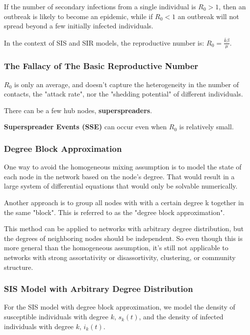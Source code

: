 \documentclass[11pt]{scrartcl} %
\begin{document}
If the number of secondary infections from a single individual is $R_0>1$, then an outbreak is likely to become an epidemic, while if $R_0<1$ an outbreak will not spread beyond a few initially infected individuals.

In the context of SIS and SIR models, the reproductive number is: $R_0 = \frac{\bar{k}\beta}{\mu}$.


\subsubsection{The Fallacy of The Basic Reproductive Number}
$R_0$ is only an average, and doesn't capture the heterogeneity in the number of contacts, the "attack rate", nor the "shedding potential" of different individuals. 

There can be a few hub nodes, \textbf{superspreaders}.

\textbf{Superspreader Events (SSE)} can occur even when $R_0$ is relatively small.

\subsubsection{Degree Block Approximation}
One way to avoid the homogeneous mixing assumption is to model the state of each node in the network based on the node's degree. That would result in a large system of differential equations that would only be solvable numerically.

Another approach is to group all nodes with with a certain degree k together in the same "block". This is referred to as the "degree block approximation".

This method can be applied to networks with arbitrary degree distribution, but the degrees of neighboring nodes should be independent. So even though this is more general than the homogeneous assumption, it's still not applicable to networks with strong assortativity or disassortivity, clustering, or community structure.

\subsubsection{SIS Model with Arbitrary Degree Distribution}
For the SIS model with degree block approximation, we model the density of susceptible individuals with degree $k$, $s_k(t)$, and the density of infected individuals with degree $k$, $i_k(t)$.
\end{document}
